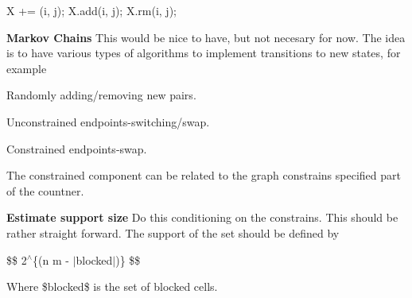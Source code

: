 \begin{DoxyCode}
X += (i, j);
X.add(i, j);
X.rm(i, j);
\end{DoxyCode}



\begin{DoxyItemize}
\item {\bfseries Markov Chains} This would be nice to have, but not necesary for now. The idea is to have various types of algorithms to implement transitions to new states, for example
\begin{DoxyItemize}
\item Randomly adding/removing new pairs.
\item Unconstrained endpoints-\/switching/swap.
\item Constrained endpoints-\/swap.
\end{DoxyItemize}

The constrained component can be related to the graph constrains specified part of the countner.
\item {\bfseries Estimate support size} Do this conditioning on the constrains. This should be rather straight forward. The support of the set should be defined by

\$\$ 2$^\wedge$\{(n m -\/ $\vert$blocked$\vert$)\} \$\$

Where \$blocked\$ is the set of blocked cells. 
\end{DoxyItemize}
